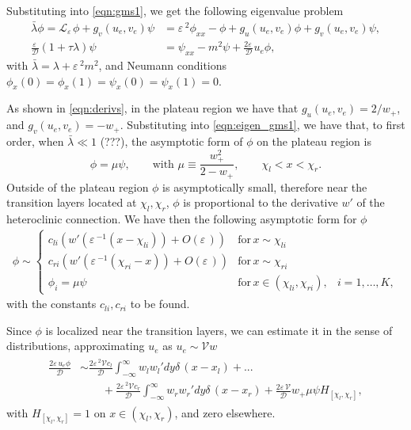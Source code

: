 \documentclass[a4paper,10pt]{article}
\newcommand{\dE}{\ensuremath{\delta\,}}
\newcommand{\lA}{\ensuremath{\lambda}}
\newcommand{\Ep}{\ensuremath{\varepsilon\,}}
\newcommand{\DD}{\ensuremath{\mathcal{D}}}
\newcommand{\VV}{\ensuremath{\mathcal{V}}}
\newcommand{\LL}{\ensuremath{\mathcal{L}}}
\begin{document}
Substituting into \eqref{eqn:gms1}, we get the following eigenvalue problem
%
\begin{subequations}
\begin{align}
\label{eqn:eigen_gms1}
  \bar{\lA}\phi = \LL_{\Ep}\phi + g_v(u_e,v_e)\psi &= \Ep^2\phi_{xx} - \phi + g_u(u_e,v_e)\phi + g_v(u_e,v_e)\psi,\\
\label{eqn:eigen_gms2}
  \frac{\Ep}{\DD}(1+\tau\lA)\psi &= \psi_{xx} - m^2\psi + \frac{2\Ep}{\DD}u_e\phi,
\end{align}
\end{subequations}
% 
with $\bar{\lA} = \lA + \Ep^2m^2$, and Neumann conditions $\phi_x(0)=\phi_x(1)=\psi_x(0)=\psi_x(1)=0$.

As shown in \eqref{eqn:derivs}, in the plateau region we have that $g_u(u_e,v_e) = 2/w_+$, and $g_v(u_e,v_e) = -w_+$. Substituting into \eqref{eqn:eigen_gms1}, we have that, to first order, when $\bar{\lA}\ll 1$ (???), the asymptotic form of $\phi$ on the plateau region is 
% 
\begin{equation}
  \phi = \mu\psi,\qquad \textrm{with  }\mu \equiv \frac{w_+^2}{2-w_+},\qquad \chi_l<x<\chi_r.
\end{equation}
% 
Outside of the plateau region $\phi$ is asymptotically small, therefore near the transition layers located at $\chi_l,\chi_r$, $\phi$ is proportional to the derivative $w'$ of the heteroclinic connection. We have then the following asymptotic form for $\phi$
% 
\begin{equation}
\label{eqn:phi_asy2}
	\begin{split}
	\phi
   \sim \left\{
	\begin{matrix}
		c_{li}(w'(\Ep^{-1}(x-\chi_{li}))+O(\Ep))& \mathrm{for}\hspace{2pt} x\sim\chi_{li}& \\
		c_{ri}(w'(\Ep^{-1}(\chi_{ri}-x))+O(\Ep))& \mathrm{for}\hspace{2pt} x\sim\chi_{ri}& \\
		\phi_i = \mu\psi& \mathrm{for}\hspace{2pt}x\in(\chi_{li},\chi_{ri}),&i=1,\hdots,K,
	\end{matrix}\right.
	\end{split}
\end{equation}
% 
with the constants $c_{li},c_{ri}$ to be found.

Since $\phi$ is localized near the transition layers, we can estimate it in the sense of distributions, approximating $u_e$ as $u_e\sim\VV w$
% 
\begin{equation}
\begin{split}
\begin{aligned}
  \frac{2\Ep u_e\phi}{\DD}&\sim \frac{2\Ep^2\VV c_l}{\DD}\int_{-\infty}^{\infty}w_lw_l'dy\dE(x-x_l) +...\\ 
  &\qquad+\frac{2\Ep^2\VV c_r}{\DD}\int_{-\infty}^{\infty}w_rw_r'dy\dE(x-x_r) + \frac{2\Ep\VV}{\DD}w_+\mu\psi H_{[\chi_l,\chi_r]},
\end{aligned}
\end{split}
\end{equation}
% 
with $H_{[\chi_l,\chi_r]} = 1$ on $x\in (\chi_l,\chi_r)$, and zero elsewhere.
\end{document}
